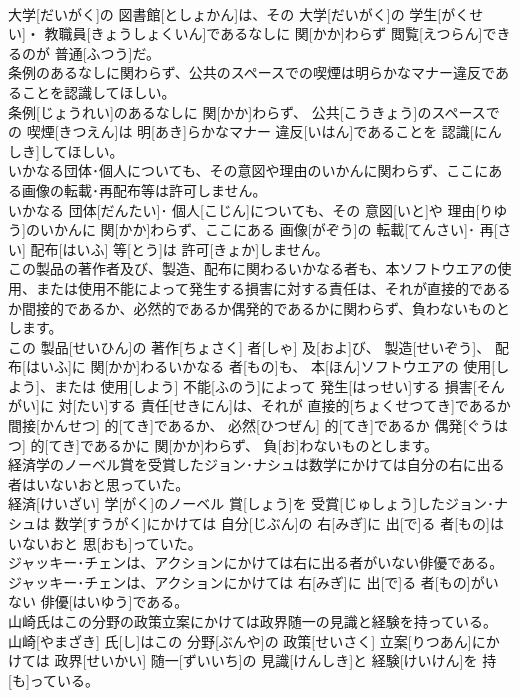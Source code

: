 \documentclass[8pt]{extreport}
\begin{document}
\begin{CJK}{UTF8}{min}
\\	大学[だいがく]の 図書館[としょかん]は、その 大学[だいがく]の 学生[がくせい]・ 教職員[きょうしょくいん]であるなしに 関[かか]わらず 閲覧[えつらん]できるのが 普通[ふつう]だ。
\\	条例のあるなしに関わらず、公共のスペースでの喫煙は明らかなマナー違反であることを認識してほしい。	
\\	条例[じょうれい]のあるなしに 関[かか]わらず、 公共[こうきょう]のスペースでの 喫煙[きつえん]は 明[あき]らかなマナー 違反[いはん]であることを 認識[にんしき]してほしい。
\\	いかなる団体･個人についても、その意図や理由のいかんに関わらず、ここにある画像の転載･再配布等は許可しません。	
\\	いかなる 団体[だんたい]･ 個人[こじん]についても、その 意図[いと]や 理由[りゆう]のいかんに 関[かか]わらず、ここにある 画像[がぞう]の 転載[てんさい]･ 再[さい] 配布[はいふ] 等[とう]は 許可[きょか]しません。
\\	この製品の著作者及び、製造、配布に関わるいかなる者も、本ソフトウエアの使用、または使用不能によって発生する損害に対する責任は、それが直接的であるか間接的であるか、必然的であるか偶発的であるかに関わらず、負わないものとします。	
\\	この 製品[せいひん]の 著作[ちょさく] 者[しゃ] 及[およ]び、 製造[せいぞう]、 配布[はいふ]に 関[かか]わるいかなる 者[もの]も、 本[ほん]ソフトウエアの 使用[しよう]、または 使用[しよう] 不能[ふのう]によって 発生[はっせい]する 損害[そんがい]に 対[たい]する 責任[せきにん]は、それが 直接的[ちょくせつてき]であるか 間接[かんせつ] 的[てき]であるか、 必然[ひつぜん] 的[てき]であるか 偶発[ぐうはつ] 的[てき]であるかに 関[かか]わらず、 負[お]わないものとします。
\\	経済学のノーベル賞を受賞したジョン･ナシュは数学にかけては自分の右に出る者はいないおと思っていた。	
\\	経済[けいざい] 学[がく]のノーベル 賞[しょう]を 受賞[じゅしょう]したジョン･ナシュは 数学[すうがく]にかけては 自分[じぶん]の 右[みぎ]に 出[で]る 者[もの]はいないおと 思[おも]っていた。
\\	ジャッキー･チェンは、アクションにかけては右に出る者がいない俳優である。	
\\	ジャッキー･チェンは、アクションにかけては 右[みぎ]に 出[で]る 者[もの]がいない 俳優[はいゆう]である。
\\	山崎氏はこの分野の政策立案にかけては政界随一の見識と経験を持っている。	
\\	山崎[やまざき] 氏[し]はこの 分野[ぶんや]の 政策[せいさく] 立案[りつあん]にかけては 政界[せいかい] 随一[ずいいち]の 見識[けんしき]と 経験[けいけん]を 持[も]っている。

\end{CJK}
\end{document}
